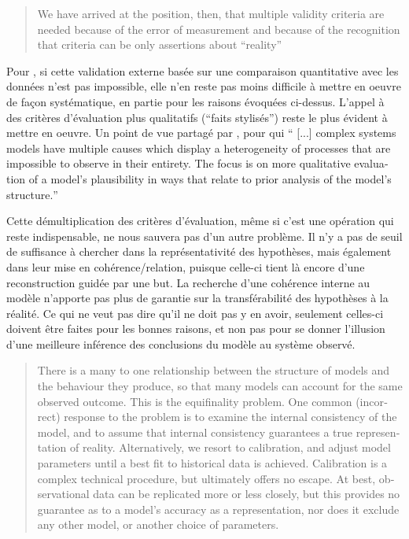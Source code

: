 \foreignblockquote{english}[\cite{Hermann1967}]{We have arrived at the position, then, that multiple validity criteria are needed because of the error of measurement and because of the recognition that criteria can be only assertions about \enquote{reality}}

Pour \textcite{Amblard2006}, si cette validation externe basée sur une comparaison quantitative avec les données n'est pas impossible, elle n'en reste pas moins difficile à mettre en oeuvre de façon systématique, en partie pour les raisons évoquées ci-dessus. L'appel à des critères d'évaluation plus qualitatifs (\enquote{faits stylisés}) reste le plus évident à mettre en oeuvre. Un point de vue partagé par \textcite{Batty2001}, pour qui \foreignquote{english}{ [...] complex systems models have multiple causes which display a heterogeneity of processes that are impossible to observe in their entirety. The focus is on more qualitative evaluation of a model’s plausibility in ways that relate to prior analysis of the model’s structure.}

Cette démultiplication des critères d'évaluation, même si c'est une opération qui reste indispensable, ne nous sauvera pas d'un autre problème. Il n'y a pas de seuil de suffisance à chercher dans la représentativité des hypothèses, mais également dans leur mise en cohérence/relation, puisque celle-ci tient là encore d'une reconstruction guidée par une but. La recherche d'une cohérence interne au modèle n'apporte pas plus de garantie sur la transférabilité des hypothèses à la réalité. Ce qui ne veut pas dire qu'il ne doit pas y en avoir, seulement celles-ci doivent être faites pour les bonnes raisons, et non pas pour se donner l'illusion d'une meilleure inférence des conclusions du modèle au système observé.

\foreignblockquote{english}[\cite{OSullivan2004}]{There is a many to one relationship between the structure of models and the behaviour they produce, so that many models can account for the same observed outcome. This is the equifinality problem. One common (incorrect) response to the problem is to examine the internal consistency of the model, and to assume that internal consistency guarantees a true representation of reality. Alternatively, we resort to calibration, and adjust model parameters until a best fit to historical data is achieved. Calibration is a complex technical procedure, but ultimately offers no escape. At best, observational data can be replicated more or less closely, but this provides no guarantee as to a model’s accuracy as a representation, nor does it exclude any other model, or another choice of parameters.}

